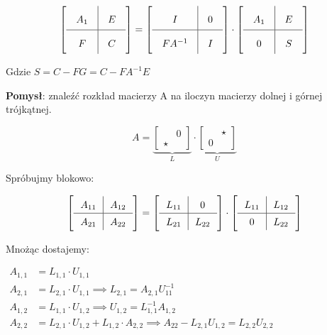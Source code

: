 \documentclass[hidelinks,a4paper,fleqn]{article}
\newcommand{\eye}{I}
\begin{document}
\[\arraycolsep=1em\def\arraystretch{2}
	\left[
		\begin{array}{c|c}
			A_1 & E \\ \hline
			F   & C 
		\end{array}
	\right] =
	\left[
		\begin{array}{c|c}
			\eye     & 0 \\ \hline
			F A^{-1} & I 
		\end{array}
	\right]
	\cdot 
	\left[
		\begin{array}{c|c}
			A_1 & E \\ \hline
			0   & S 
		\end{array}
	\right]
\]

Gdzie $S = C - FG = C - FA^{-1}E$


\textbf{Pomysł}: znaleźć rozkład macierzy A na iloczyn macierzy dolnej i górnej trójkątnej.

\[
	A = \underbrace{\left[
			\begin{array}{cc}
				      & 0 \\
				\star &   
			\end{array}
		\right]}_{L} \cdot
	\underbrace{\left[
			\begin{array}{cc}
				  & \star \\
				0 &       
			\end{array}
		\right]}_{U}
\]

Spróbujmy blokowo:

\[\arraycolsep=0.7em\def\arraystretch{1.4}
	\left[
		\begin{array}{c|c}
			A_{11} & A_{12} \\ \hline
			A_{21} & A_{22} 
		\end{array}
	\right] =
	\left[
		\begin{array}{c|c}
			L_{11} & 0      \\ \hline
			L_{21} & L_{22} 
		\end{array}
	\right]
	\cdot 
	\left[
		\begin{array}{c|c}
			L_{11} & L_{12} \\ \hline
			0      & L_{22} 
		\end{array}
	\right]
\]

Mnożąc dostajemy:

$
\begin{array}{ll}
	A_{1,1} & = L_{1,1} \cdot U_{1,1}                                                                           \\
	A_{2,1} & = L_{2,1} \cdot U_{1,1} \implies L_{2,1} = A_{2,1}U_{11}^{-1}                                     \\
	A_{1,2} & = L_{1,1} \cdot U_{1,2}  \implies U_{1,2} = L^{-1}_{1,1} A_{1,2}                                  \\
	A_{2,2} & = L_{2,1} \cdot U_{1,2} + L_{1,2} \cdot A_{2,2} \implies A_{22} - L_{2,1}U_{1,2} = L_{2,2}U_{2,2} 
\end{array}
$
\end{document}
